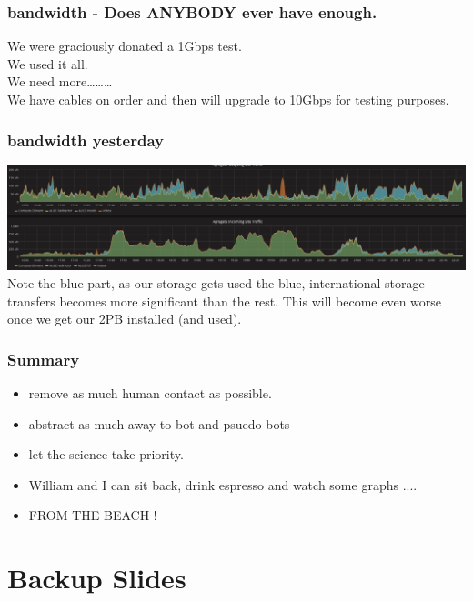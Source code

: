 \documentclass{beamer}
\begin{document}
\begin{frame}
  \frametitle{bandwidth - Does ANYBODY ever have enough.}
  We were graciously donated a 1Gbps test.\\
  We used it all.\\
  We need more\ldots\ldots\ldots \\
  We have cables on order and then will upgrade to 10Gbps for testing purposes.
\end{frame}
\begin{frame}
    \frametitle{bandwidth yesterday}
\center    \includegraphics[scale=0.25]{Tier2Bandwidthcrop.pdf} \\ %
Note the blue part, as our storage gets used the blue, international storage transfers becomes more significant than the rest. This
will become even worse once we get our 2PB installed (and used).
\end{frame}
\begin{frame}
  \frametitle{Summary}
  \begin{itemize}
    \item<2-> remove as much human contact as possible.
    \item<3-> abstract as much away to bot and psuedo bots
    \item<4-> let the science take priority.
    \item<5> William and I can sit back, drink espresso and watch some graphs ....
    \item<6> FROM THE BEACH !
  \end{itemize}
\end{frame}

\section{Backup Slides}
\end{document}

